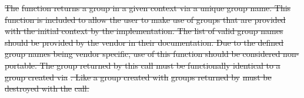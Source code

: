 \documentclass[12pt]{report} %
\providecommand{\DIFdeltex}[1]{{\protect\color{red}\sout{#1}}}                      %
\providecommand{\DIFdel}[1]{\texorpdfstring{\DIFdeltex{#1}}{}} %
\begin{document}
\DIFdel{The }%
\DIFdel{function returns a group in a given context via a unique group name.
This function is included to allow the user to make use of groups that are provided with the initial context by the implementation.
The list of valid group names should be provided by the vendor in their documentation.
Due to the defined group names being vendor specific, use of this function should be considered non-portable.
The group returned by this call must be functionally identical to a group created via }%
\DIFdel{.
Like a group created with }%
\DIFdel{groups returned by }%
\DIFdel{must be destroyed with the }%
\DIFdel{call.
}%

\end{document}
